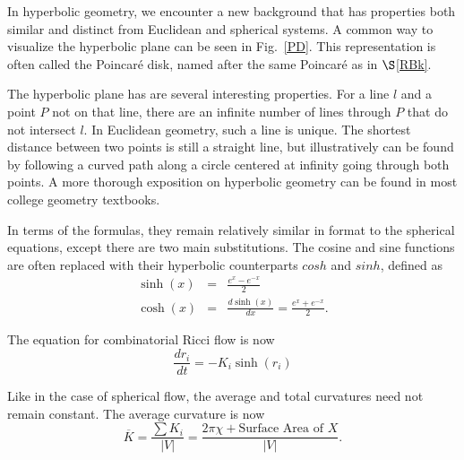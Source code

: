 \documentclass[12pt]{article}
\begin{document}
In hyperbolic geometry, we encounter a new background that has properties both similar and distinct from Euclidean and spherical systems. A common way to visualize the hyperbolic plane can be seen in Fig.~\ref{PD}. This representation is often called the Poincar\'{e} disk, named after the same Poincar\'{e} as in $\S$\ref{RBk}.\newline

\noindent The hyperbolic plane has are several interesting properties. For a line $l$ and a point $P$ not on that line, there are an infinite number of lines through $P$ that do not intersect $l$. In Euclidean geometry, such a line is unique. The shortest distance between two points is still a straight line, but illustratively can be found by following a curved path along a circle centered at infinity going through both points. A more thorough exposition on hyperbolic geometry can be found in most college geometry textbooks.\newline

\noindent In terms of the formulas, they remain relatively similar in format to the spherical equations, except there are two main substitutions. The cosine and sine functions are often replaced with their hyperbolic counterparts $cosh$ and $sinh$, defined as
\begin{eqnarray*}
\sinh(x) &=& \frac{e^x - e^{-x}}{2}\\
\cosh(x) &=& \frac{d\sinh(x)}{dx} = \frac{e^x + e^{-x}}{2}.
\end{eqnarray*}

\noindent The equation for combinatorial Ricci flow is now
\begin{equation}
\label{HRiccif}
\frac{dr_i}{dt} = -K_i\sinh(r_i)
\end{equation}
\noindent 

\noindent Like in the case of spherical flow, the average and total curvatures need not remain constant. The average curvature is now
$$\overline{K} = \frac{\sum{K_i}}{|V|} = \frac{2\pi\chi + \mbox{Surface Area of }X}{|V|}.$$
\end{document}
